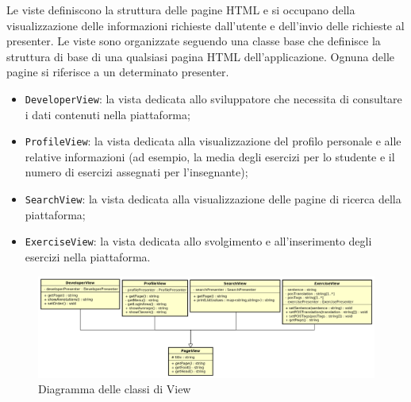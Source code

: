Le viste definiscono la struttura delle pagine HTML e si occupano della visualizzazione delle informazioni richieste dall'utente e dell'invio delle richieste al presenter. Le viste sono organizzate seguendo una classe base che definisce la struttura di base di una qualsiasi pagina HTML dell'applicazione. Ognuna delle pagine si riferisce a un determinato presenter.
\begin{itemize}
	\item \texttt{DeveloperView}: la vista dedicata allo sviluppatore che necessita di consultare i dati contenuti nella piattaforma; 
	\item \texttt{ProfileView}: la vista dedicata alla visualizzazione del profilo personale e alle relative informazioni (ad esempio, la media degli esercizi per lo studente e il numero di esercizi assegnati per l'insegnante);
	\item \texttt{SearchView}: la vista dedicata alla visualizzazione delle pagine di ricerca della piattaforma;
	\item \texttt{ExerciseView}: la vista dedicata allo svolgimento e all'inserimento degli esercizi nella piattaforma.
\end{itemize}

\begin{figure}[h]
	\includegraphics[scale=0.41]{images/View.png}
	\caption{Diagramma delle classi di View}
\end{figure}
